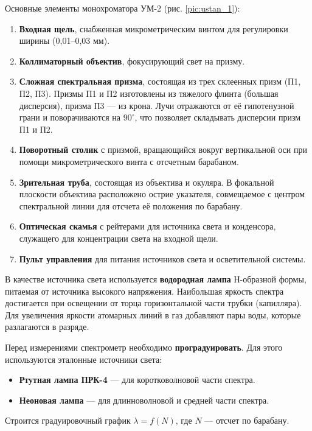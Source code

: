 \documentclass[a4paper,12pt]{article}
\begin{document}
Основные элементы монохроматора УМ-2 (рис. \ref{pic:ustan_1}):
\begin{enumerate}
    \item \textbf{Входная щель}, снабженная микрометрическим винтом для регулировки ширины (0,01–0,03 мм).
    \item \textbf{Коллиматорный объектив}, фокусирующий свет на призму.
    \item \textbf{Сложная спектральная призма}, состоящая из трех склеенных призм (П1, П2, П3). Призмы П1 и П2 изготовлены из тяжелого флинта (большая дисперсия), призма П3 — из крона. Лучи отражаются от её гипотенузной грани и поворачиваются на \(90^\circ\), что позволяет складывать дисперсии призм П1 и П2.
    \item \textbf{Поворотный столик} с призмой, вращающийся вокруг вертикальной оси при помощи микрометрического винта с отсчетным барабаном.
    \item \textbf{Зрительная труба}, состоящая из объектива и окуляра. В фокальной плоскости объектива расположено острие указателя, совмещаемое с центром спектральной линии для отсчета её положения по барабану.
    \item \textbf{Оптическая скамья} с рейтерами для источника света и конденсора, служащего для концентрации света на входной щели.
    \item \textbf{Пульт управления} для питания источников света и осветительной системы.
\end{enumerate}




В качестве источника света используется \textbf{водородная лампа} Н-образной формы, питаемая от источника высокого напряжения. Наибольшая яркость спектра достигается при освещении от торца горизонтальной части трубки (капилляра). Для увеличения яркости атомарных линий в газ добавляют пары воды, которые разлагаются в разряде.

Перед измерениями спектрометр необходимо \textbf{проградуировать}. Для этого используются эталонные источники света:
\begin{itemize}
    \item \textbf{Ртутная лампа ПРК-4} — для коротковолновой части спектра.
    \item \textbf{Неоновая лампа} — для длинноволновой и средней части спектра.
\end{itemize}

Строится градуировочный график \(\lambda = f(N)\), где \(N\) — отсчет по барабану.
\end{document}
